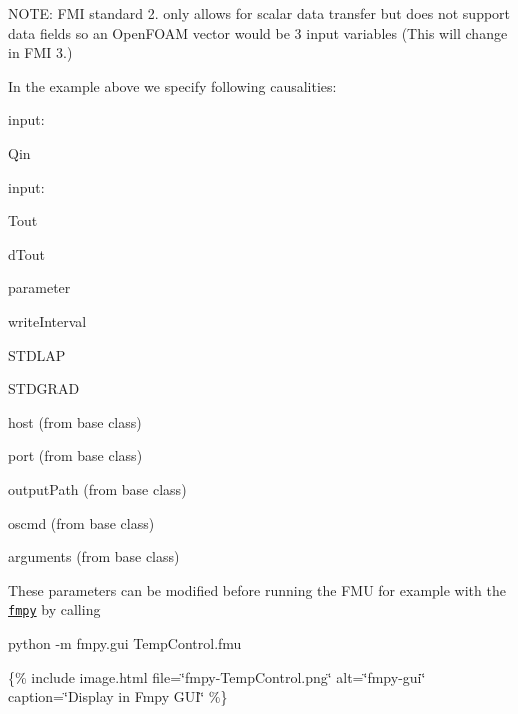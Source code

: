 N\+O\+TE\+: F\+MI standard 2. only allows for scalar data transfer but does not support data fields so an Open\+F\+O\+AM vector would be 3 input variables (This will change in F\+MI 3.)

In the example above we specify following causalities\+:


\begin{DoxyItemize}
\item input\+:
\begin{DoxyItemize}
\item Qin
\end{DoxyItemize}
\item input\+:
\begin{DoxyItemize}
\item Tout
\item d\+Tout
\end{DoxyItemize}
\item parameter
\begin{DoxyItemize}
\item write\+Interval
\item S\+T\+D\+L\+AP
\item S\+T\+D\+G\+R\+AD
\item host (from base class)
\item port (from base class)
\item output\+Path (from base class)
\item oscmd (from base class)
\item arguments (from base class)
\end{DoxyItemize}
\end{DoxyItemize}

These parameters can be modified before running the F\+MU for example with the \href{https://github.com/CATIA-Systems/FMPy}{\tt fmpy} by calling


\begin{DoxyCode}
python -m fmpy.gui TempControl.fmu
\end{DoxyCode}


\{\% include image.\+html file=\char`\"{}fmpy-\/\+Temp\+Control.\+png\char`\"{} alt=\char`\"{}fmpy-\/gui\char`\"{} caption=\char`\"{}\+Display in Fmpy G\+U\+I\char`\"{} \%\} 